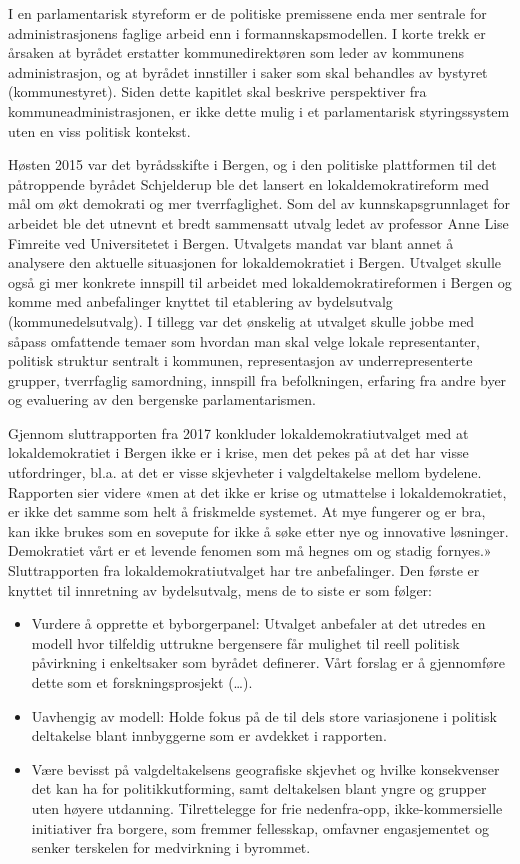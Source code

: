 \documentclass[
  12pt,
  a4paper, 12pt]{article}
\begin{document}
I en parlamentarisk styreform er de politiske premissene enda mer sentrale for administrasjonens faglige arbeid enn i formannskapsmodellen. I korte trekk er årsaken at byrådet erstatter kommunedirektøren som leder av kommunens administrasjon, og at byrådet innstiller i saker som skal behandles av bystyret (kommunestyret). Siden dette kapitlet skal beskrive perspektiver fra kommuneadministrasjonen, er ikke dette mulig i et parlamentarisk styringssystem uten en viss politisk kontekst.

Høsten 2015 var det byrådsskifte i Bergen, og i den politiske plattformen til det påtroppende byrådet Schjelderup ble det lansert en lokaldemokratireform med mål om økt demokrati og mer tverrfaglighet. Som del av kunnskapsgrunnlaget for arbeidet ble det utnevnt et bredt sammensatt utvalg ledet av professor Anne Lise Fimreite ved Universitetet i Bergen. Utvalgets mandat var blant annet å analysere den aktuelle situasjonen for lokaldemokratiet i Bergen. Utvalget skulle også gi mer konkrete innspill til arbeidet med lokaldemokratireformen i Bergen og komme med anbefalinger knyttet til etablering av bydelsutvalg (kommunedelsutvalg). I tillegg var det ønskelig at utvalget skulle jobbe med såpass omfattende temaer som hvordan man skal velge lokale representanter, politisk struktur sentralt i kommunen, representasjon av underrepresenterte grupper, tverrfaglig samordning, innspill fra befolkningen, erfaring fra andre byer og evaluering av den bergenske parlamentarismen.

Gjennom sluttrapporten fra 2017 konkluder lokaldemokratiutvalget med at lokaldemokratiet i Bergen ikke er i krise, men det pekes på at det har visse utfordringer, bl.a. at det er visse skjevheter i valgdeltakelse mellom bydelene. Rapporten sier videre «men at det ikke er krise og utmattelse i lokaldemokratiet, er ikke det samme som helt å friskmelde systemet. At mye fungerer og er bra, kan ikke brukes som en sovepute for ikke å søke etter nye og innovative løsninger. Demokratiet vårt er et levende fenomen som må hegnes om og stadig fornyes.»
Sluttrapporten fra lokaldemokratiutvalget har tre anbefalinger. Den første er knyttet til innretning av bydelsutvalg, mens de to siste er som følger:

\begin{itemize}
\item
  Vurdere å opprette et byborgerpanel: Utvalget anbefaler at det utredes en modell hvor tilfeldig uttrukne bergensere får mulighet til reell politisk påvirkning i enkeltsaker som byrådet definerer. Vårt forslag er å gjennomføre dette som et forskningsprosjekt (\ldots).
\item
  Uavhengig av modell: Holde fokus på de til dels store variasjonene i politisk deltakelse blant innbyggerne som er avdekket i rapporten.
\item
  Være bevisst på valgdeltakelsens geografiske skjevhet og hvilke konsekvenser det kan ha for politikkutforming, samt deltakelsen blant yngre og grupper uten høyere utdanning. Tilrettelegge for frie nedenfra-opp, ikke-kommersielle initiativer fra borgere, som fremmer fellesskap, omfavner engasjementet og senker terskelen for medvirkning i byrommet.
\end{itemize}
\end{document}
